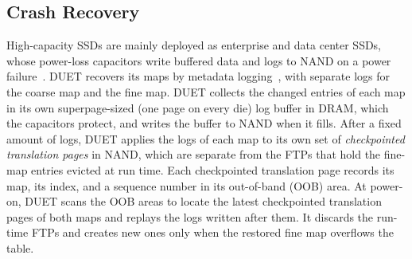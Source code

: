 \subsection{Crash Recovery}
High-capacity SSDs are mainly deployed as enterprise and data center SSDs, whose
power-loss capacitors write buffered data and logs to NAND on a power
failure~\cite{solidigm-p5336-spec,ocp-dcssd}. DUET recovers its maps by metadata
logging~\cite{maplog,mew}, with separate logs for the coarse map and the fine map. DUET collects
the changed entries of each map in its own superpage-sized (one page on every die) log buffer in DRAM, which the capacitors
protect, and writes the buffer to NAND when it fills. After a fixed amount of logs, DUET applies the logs
of each map to its own set of \emph{checkpointed translation pages} in NAND,
which are separate from the FTPs that hold the fine-map entries evicted at run time. Each
checkpointed translation page records its map, its index, and a sequence number in its
out-of-band (OOB) area. At power-on, DUET scans the OOB areas to locate the latest checkpointed
translation pages of both maps and replays the logs written after them. It discards the
run-time FTPs and creates new ones only when the restored fine map overflows the table.
